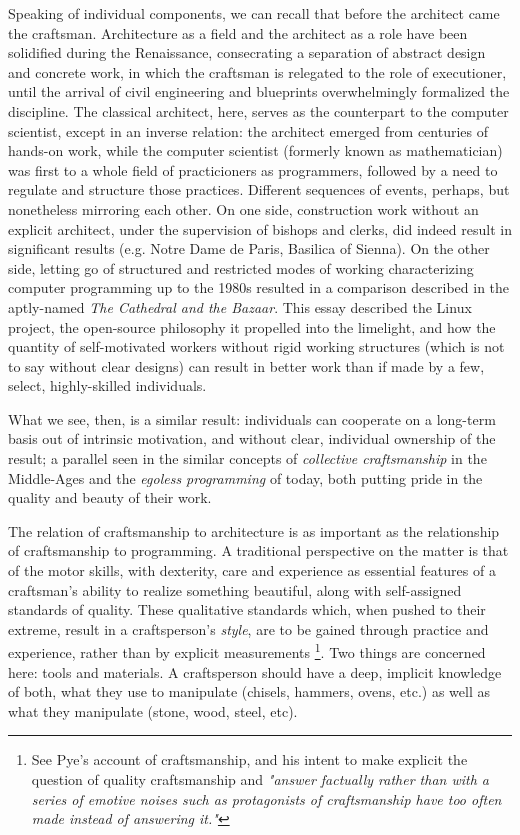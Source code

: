 \documentclass{article}
\begin{document}
Speaking of individual components, we can recall that before the architect came the craftsman. Architecture as a field and the architect as a role have been solidified during the Renaissance, consecrating a separation of abstract design and concrete work, in which the craftsman is relegated to the role of executioner, until the arrival of civil engineering and blueprints overwhelmingly formalized the discipline. The classical architect, here, serves as the counterpart to the computer scientist, except in an inverse relation: the architect emerged from centuries of hands-on work, while the computer scientist (formerly known as mathematician) was first to a whole field of practicioners as programmers, followed by a need to regulate and structure those practices. Different sequences of events, perhaps, but nonetheless mirroring each other. On one side, construction work without an explicit architect, under the supervision of bishops and clerks, did indeed result in significant results (e.g. Notre Dame de Paris, Basilica of Sienna). On the other side, letting go of structured and restricted modes of working characterizing computer programming up to the 1980s resulted in a comparison described in the aptly-named \textit{The Cathedral and the Bazaar}. This essay described the Linux project, the open-source philosophy it propelled into the limelight, and how the quantity of self-motivated workers without rigid working structures (which is not to say without clear designs) can result in better work than if made by a few, select, highly-skilled individuals\cite{raymond_cathedral_2001}.

What we see, then, is a similar result: individuals can cooperate on a long-term basis out of intrinsic motivation, and without clear, individual ownership of the result; a parallel seen in the similar concepts of \textit{collective craftsmanship} in the Middle-Ages and the \emph{egoless programming} of today\cite{brooks_mythical_1975}, both putting pride in the quality and beauty of their work.

The relation of craftsmanship to architecture is as important as the relationship of craftsmanship to programming. A traditional perspective on the matter is that of the motor skills, with dexterity, care and experience as essential features of a craftsman's ability to realize something beautiful\cite{osborne_aesthetic_1977}, along with self-assigned standards of quality\cite{sennett_craftsman_2009}. These qualitative standards which, when pushed to their extreme, result in a craftsperson's \emph{style}, are to be gained through practice and experience, rather than by explicit measurements\cite{pye_nature_2008} \footnote{See Pye's account of craftsmanship, and his intent to make explicit the question of quality craftsmanship and \emph{"answer factually rather than with a series of emotive noises such as protagonists of craftsmanship have too often made instead of answering it."}}. Two things are concerned here: tools and materials\cite{pye_nature_2008}. A craftsperson should have a deep, implicit knowledge of both, what they use to manipulate (chisels, hammers, ovens, etc.) as well as what they manipulate (stone, wood, steel, etc).
\end{document}
